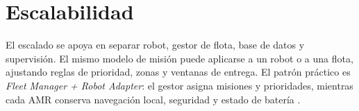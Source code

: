 \section{Escalabilidad}

El escalado se apoya en separar robot, gestor de flota, base de datos y supervisión. El mismo modelo de misión puede aplicarse a un robot o a una flota, ajustando reglas de prioridad, zonas y ventanas de entrega. El patrón práctico es \textit{Fleet Manager + Robot Adapter}: el gestor asigna misiones y prioridades, mientras cada AMR conserva navegación local, seguridad y estado de batería \cite{kagan2019}.
